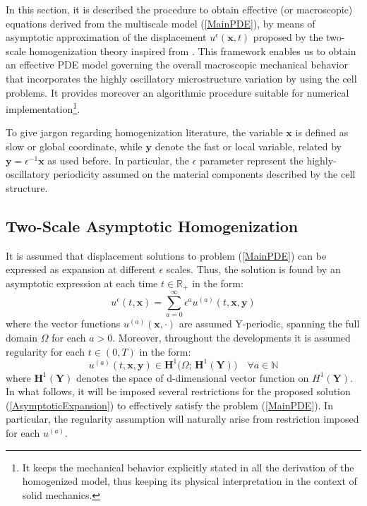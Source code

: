  In this section, it is described the procedure to obtain effective (or macroscopic) equations derived from the multiscale model (\ref{MainPDE}), by means of asymptotic approximation of the displacement $u^{\epsilon}(\mathbf{x},t)$ proposed by the two-scale homogenization theory inspired from \cite{altenbach2018generalized}. This framework enables us to obtain an effective PDE model governing the overall macroscopic mechanical behavior that incorporates the highly oscillatory microstructure variation by using the cell problems. It provides moreover an algorithmic procedure suitable for numerical implementation\footnote{It keeps the mechanical behavior explicitly stated in all the derivation of the homogenized model, thus keeping its physical interpretation in the context of solid mechanics.}.

To give jargon regarding homogenization literature, the variable $\mathbf{x}$ is defined as slow or global coordinate, while $\mathbf{y}$ denote the fast or local variable, related by $\mathbf{y} = \epsilon^{-1}\mathbf{x}$ as used before. In particular, the $\epsilon$ parameter represent the highly-oscillatory periodicity assumed on the material components described by the cell structure.

\subsection{Two-Scale Asymptotic Homogenization}
It is assumed that displacement solutions to problem (\ref{MainPDE}) can be expressed as expansion at different $\epsilon$ scales. Thus, the solution is found by an asymptotic expression at each time $t \in \mathbb{R}_+$ in the form:
\begin{equation}
    \label{AsymptoticExpansion}
    u^{\epsilon}(t, \mathbf{x}) = \sum_{a=0}^{\infty} \epsilon^a u^{(a)}(t, \mathbf{x},\mathbf{y}) 
\end{equation}
where the vector functions $u^{(a)}(\mathbf{x}, \cdot)$ are assumed Y-periodic, spanning the full domain $\Omega$ for each $a>0$. Moreover, throughout the developments it is assumed regularity for each $t \in (0,T)$ in the form:
\begin{equation*}
    u^{(a)}(t, \mathbf{x},\mathbf{y}) \in \mathbf{H}^1\big(\Omega; \, \mathbf{H}^1(\mathbf{Y})\big) \quad \forall a \in \mathbb{N}
\end{equation*}
where $\mathbf{H}^1(\mathbf{Y})$ denotes the space of d-dimensional vector function on $H^1(\mathbf{Y})$.
In what follows, it will be imposed several restrictions for the proposed solution (\ref{AsymptoticExpansion}) to effectively satisfy the problem (\ref{MainPDE}). In particular, the regularity assumption will naturally arise from restriction imposed for each $u^{(a)}$.

